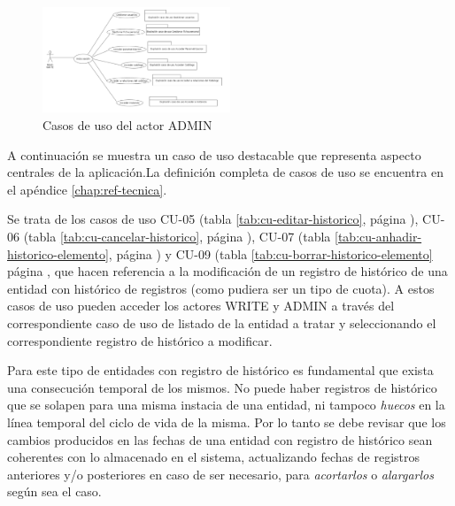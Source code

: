 \begin{figure}[H]
  \centering
  \includegraphics[width=0.50\textwidth]{imaxes/cu-admin.png}
  \caption{Casos de uso del actor ADMIN}
  \label{fig:cu-admin}
\end{figure}



A continuación se muestra un caso de uso destacable que representa
aspecto centrales de la aplicación.La definición completa de casos de uso se encuentra en el apéndice \ref{chap:ref-tecnica}. 

Se trata de los casos de uso CU-05 (tabla \ref{tab:cu-editar-historico}, página \pageref{tab:cu-editar-historico}), CU-06 (tabla \ref{tab:cu-cancelar-historico}, página \pageref{tab:cu-cancelar-historico}), CU-07 (tabla \ref{tab:cu-anhadir-historico-elemento}, página \pageref{tab:cu-anhadir-historico-elemento}) y CU-09 (tabla \ref{tab:cu-borrar-historico-elemento} página \pageref{tab:cu-borrar-historico-elemento}, que hacen referencia a la modificación de un registro de histórico de una entidad con histórico de registros (como pudiera ser un tipo de cuota). A estos casos de uso pueden acceder los actores WRITE y ADMIN a través del correspondiente caso de uso de listado de la entidad a tratar y seleccionando el correspondiente registro de histórico a modificar.

Para este tipo de entidades con registro de histórico es fundamental que exista una consecución temporal de los mismos. No puede haber registros de histórico que se solapen para una misma instacia de una entidad, ni tampoco \textit{huecos} en la línea temporal del ciclo de vida de la misma. Por lo tanto se debe revisar que los cambios producidos en las fechas de una entidad con registro de histórico sean coherentes con lo almacenado en el sistema, actualizando fechas de registros anteriores y/o posteriores en caso de ser necesario, para \textit{acortarlos} o \textit{alargarlos} según sea el caso.


